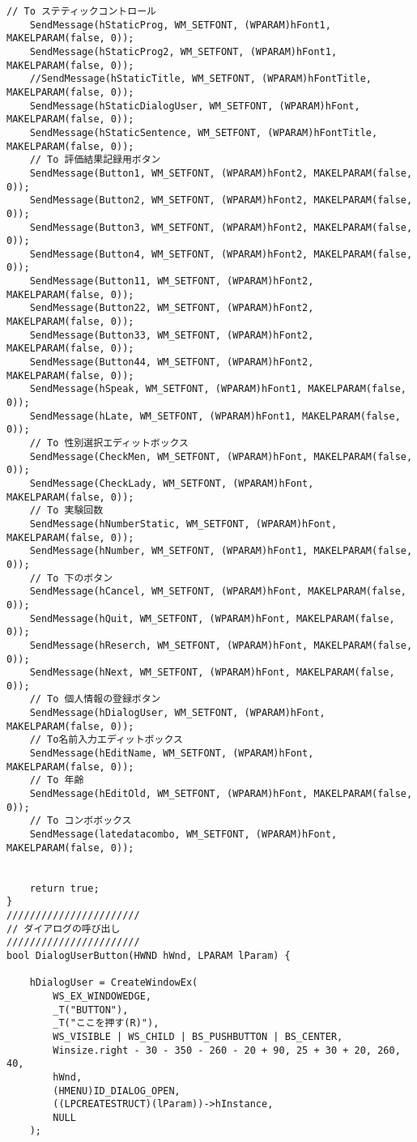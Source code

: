 \begin{lstlisting}[caption=window.cpp]
	// To ステティックコントロール
	SendMessage(hStaticProg, WM_SETFONT, (WPARAM)hFont1, MAKELPARAM(false, 0));
	SendMessage(hStaticProg2, WM_SETFONT, (WPARAM)hFont1, MAKELPARAM(false, 0));
	//SendMessage(hStaticTitle, WM_SETFONT, (WPARAM)hFontTitle, MAKELPARAM(false, 0));
	SendMessage(hStaticDialogUser, WM_SETFONT, (WPARAM)hFont, MAKELPARAM(false, 0));
	SendMessage(hStaticSentence, WM_SETFONT, (WPARAM)hFontTitle, MAKELPARAM(false, 0));
	// To 評価結果記録用ボタン
	SendMessage(Button1, WM_SETFONT, (WPARAM)hFont2, MAKELPARAM(false, 0));
	SendMessage(Button2, WM_SETFONT, (WPARAM)hFont2, MAKELPARAM(false, 0));
	SendMessage(Button3, WM_SETFONT, (WPARAM)hFont2, MAKELPARAM(false, 0));
	SendMessage(Button4, WM_SETFONT, (WPARAM)hFont2, MAKELPARAM(false, 0));
	SendMessage(Button11, WM_SETFONT, (WPARAM)hFont2, MAKELPARAM(false, 0));
	SendMessage(Button22, WM_SETFONT, (WPARAM)hFont2, MAKELPARAM(false, 0));
	SendMessage(Button33, WM_SETFONT, (WPARAM)hFont2, MAKELPARAM(false, 0));
	SendMessage(Button44, WM_SETFONT, (WPARAM)hFont2, MAKELPARAM(false, 0));
	SendMessage(hSpeak, WM_SETFONT, (WPARAM)hFont1, MAKELPARAM(false, 0));
	SendMessage(hLate, WM_SETFONT, (WPARAM)hFont1, MAKELPARAM(false, 0));
	// To 性別選択エディットボックス
	SendMessage(CheckMen, WM_SETFONT, (WPARAM)hFont, MAKELPARAM(false, 0));
	SendMessage(CheckLady, WM_SETFONT, (WPARAM)hFont, MAKELPARAM(false, 0));
	// To 実験回数
	SendMessage(hNumberStatic, WM_SETFONT, (WPARAM)hFont, MAKELPARAM(false, 0));
	SendMessage(hNumber, WM_SETFONT, (WPARAM)hFont1, MAKELPARAM(false, 0));
	// To 下のボタン
	SendMessage(hCancel, WM_SETFONT, (WPARAM)hFont, MAKELPARAM(false, 0));
	SendMessage(hQuit, WM_SETFONT, (WPARAM)hFont, MAKELPARAM(false, 0));
	SendMessage(hReserch, WM_SETFONT, (WPARAM)hFont, MAKELPARAM(false, 0));
	SendMessage(hNext, WM_SETFONT, (WPARAM)hFont, MAKELPARAM(false, 0));
	// To 個人情報の登録ボタン
	SendMessage(hDialogUser, WM_SETFONT, (WPARAM)hFont, MAKELPARAM(false, 0));
	// To名前入力エディットボックス
	SendMessage(hEditName, WM_SETFONT, (WPARAM)hFont, MAKELPARAM(false, 0));
	// To 年齢
	SendMessage(hEditOld, WM_SETFONT, (WPARAM)hFont, MAKELPARAM(false, 0));
	// To コンボボックス
	SendMessage(latedatacombo, WM_SETFONT, (WPARAM)hFont, MAKELPARAM(false, 0));

	
	return true;
}
///////////////////////
// ダイアログの呼び出し
///////////////////////
bool DialogUserButton(HWND hWnd, LPARAM lParam) {

	hDialogUser = CreateWindowEx(
		WS_EX_WINDOWEDGE,
		_T("BUTTON"),
		_T("ここを押す(R)"),
		WS_VISIBLE | WS_CHILD | BS_PUSHBUTTON | BS_CENTER,
		Winsize.right - 30 - 350 - 260 - 20 + 90, 25 + 30 + 20, 260, 40,
		hWnd,
		(HMENU)ID_DIALOG_OPEN,
		((LPCREATESTRUCT)(lParam))->hInstance,
		NULL
	);


\end{lstlisting}
